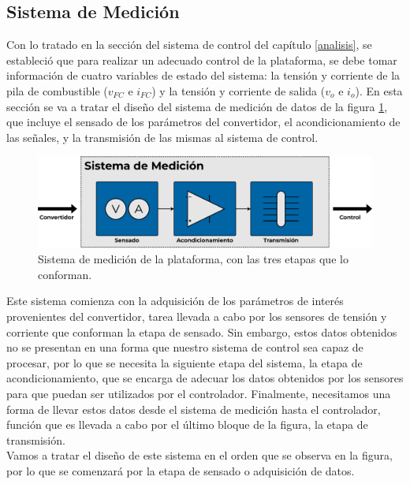 \subsection{Sistema de Medición}

Con lo tratado en la sección del sistema de control del capítulo \ref{analisis}, se estableció que para realizar un adecuado control de la plataforma, se debe tomar información de cuatro variables de estado del sistema: la tensión y corriente de la pila de combustible ($v_{FC}$ e $i_{FC}$) y la tensión y corriente de salida ($v_o$ e $i_o$). En esta sección se va a tratar el diseño del sistema de medición de datos de la figura \ref{diag_medicion}, que incluye el sensado de los parámetros del convertidor, el acondicionamiento de las señales, y la transmisión de las mismas al sistema de control.\\

\begin{figure}[h]
    \centering
    \includegraphics[scale=0.4]{Imagenes/Sistema Medicion.pdf}
    \caption{Sistema de medición de la plataforma, con las tres etapas que lo conforman.}
    \label{diag_medicion}
\end{figure}

Este sistema comienza con la adquisición de los parámetros de interés provenientes del convertidor, tarea llevada a cabo por los sensores de tensión y corriente que conforman la {\Medium etapa de sensado}. Sin embargo, estos datos obtenidos no se presentan en una forma que nuestro sistema de control sea capaz de procesar, por lo que se necesita la siguiente etapa del sistema, la {\Medium etapa de acondicionamiento}, que se encarga de adecuar los datos obtenidos por los sensores para que puedan ser utilizados por el controlador. Finalmente, necesitamos una forma de llevar estos datos desde el sistema de medición hasta el controlador, función que es llevada a cabo por el último bloque de la figura, la {\Medium etapa de transmisión}.\\

Vamos a tratar el diseño de este sistema en el orden que se observa en la figura, por lo que se comenzará por la etapa de sensado o adquisición de datos.\\

